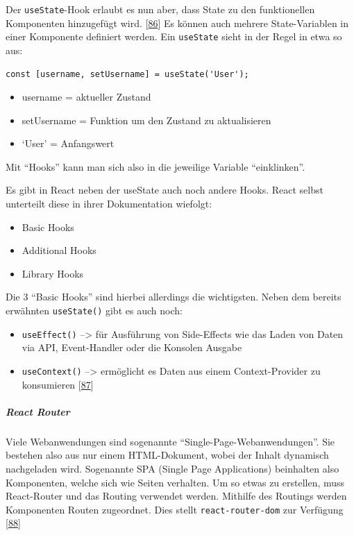 \documentclass[
    headings=optiontotocandhead,%
    twoside,
    numbers=noenddot,%
    12pt, %
    titlepage, %
    parskip=full, %
    listof=leveldown, 
    numbers=noenddot, %
    a4paper,DIV=14,
    BCOR=15mm,
]{scrbook}
\newcommand{\passthrough}[1]{#1}
\providecommand{\tightlist}{%
  \setlength{\itemsep}{0pt}\setlength{\parskip}{0pt}}
\begin{document}
Der \passthrough{\lstinline!useState!}-Hook erlaubt es nun aber, dass
State zu den funktionellen Komponenten hinzugefügt wird.
{[}\protect\hyperlink{ref-GeeksForGeeks-useState}{86}{]} Es können auch
mehrere State-Variablen in einer Komponente definiert werden. Ein
\passthrough{\lstinline!useState!} sieht in der Regel in etwa so aus:

\begin{lstlisting}[caption={Beispiel useState Variable}]
const [username, setUsername] = useState('User');
\end{lstlisting}

\begin{itemize}
\tightlist
\item
  username = aktueller Zustand
\item
  setUsername = Funktion um den Zustand zu aktualisieren
\item
  `User' = Anfangswert
\end{itemize}

Mit ``Hooks'' kann man sich also in die jeweilige Variable
``einklinken''.

Es gibt in React neben der useState auch noch andere Hooks. React selbst
unterteilt diese in ihrer Dokumentation wiefolgt:

\begin{itemize}
\tightlist
\item
  Basic Hooks
\item
  Additional Hooks
\item
  Library Hooks
\end{itemize}

Die 3 ``Basic Hooks'' sind hierbei allerdings die wichtigsten. Neben dem
bereits erwähnten \passthrough{\lstinline!useState()!} gibt es auch
noch:

\begin{itemize}
\tightlist
\item
  \passthrough{\lstinline!useEffect()!} --\textgreater{} für Ausführung
  von Side-Effects wie das Laden von Daten via API, Event-Handler oder
  die Konsolen Ausgabe
\item
  \passthrough{\lstinline!useContext()!} --\textgreater{} ermöglicht es
  Daten aus einem Context-Provider zu konsumieren
  {[}\protect\hyperlink{ref-DoubleSlash-ReactHooks}{87}{]}
\end{itemize}

\hypertarget{react-router}{%
\subparagraph{React Router}\label{react-router}}

Viele Webanwendungen sind sogenannte ``Single-Page-Webanwendungen''. Sie
bestehen also aus nur einem HTML-Dokument, wobei der Inhalt dynamisch
nachgeladen wird. Sogenannte SPA (Single Page Applications) beinhalten
also Komponenten, welche sich wie Seiten verhalten. Um so etwas zu
erstellen, muss React-Router und das Routing verwendet werden. Mithilfe
des Routings werden Komponenten Routen zugeordnet. Dies stellt
\passthrough{\lstinline!react-router-dom!} zur Verfügung
{[}\protect\hyperlink{ref-FreeCodeCamp-Routing}{88}{]}
\end{document}
